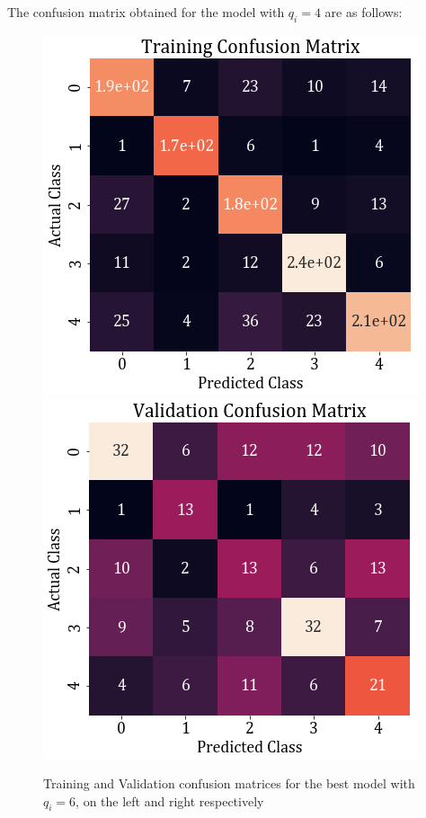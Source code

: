 \documentclass[11pt,a4paper]{article}
\newcommand{\noi}{\noindent}
\begin{document}
\noi
The confusion matrix obtained for the model with $q_i=4$ are as follows:
\begin{figure}[H]
    \centering
    \includegraphics[scale=0.5]{images/2A/2A_full_train_conf.png}
    \includegraphics[scale=0.5]{images/2A/2A_full_val_conf.png}
    \caption{Training and Validation confusion matrices for the best model with $q_i=6$, on the left and right respectively}
\end{figure}
\end{document}
